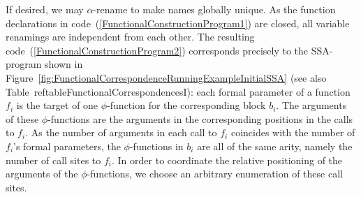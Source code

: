 If desired, we may $\alpha$-rename to make names globally unique. As
the function declarations in
code~(\ref{FunctionalConstructionProgram1}) are closed, all variable
renamings are independent from each other. The resulting
code~(\ref{FunctionalConstructionProgram2}) corresponds precisely to
the SSA-program shown in
Figure~\ref{fig:FunctionalCorrespondenceRunningExampleInitialSSA} (see
also Table~ref{tableFunctionalCorrespondencesI}): each formal
parameter of a function $f_i$ is the target of one $\phi$-function for
the corresponding block $b_i$. The arguments of these $\phi$-functions
are the arguments in the corresponding positions in the calls to
$f_i$. As the number of arguments in each call to $f_i$ coincides with
the number of $f_i$'s formal parameters, the $\phi$-functions in $b_i$
are all of the same arity, namely the number of call sites to
$f_i$. In order to coordinate the relative positioning of the
arguments of the $\phi$-functions, we choose an arbitrary enumeration
of these call sites.
